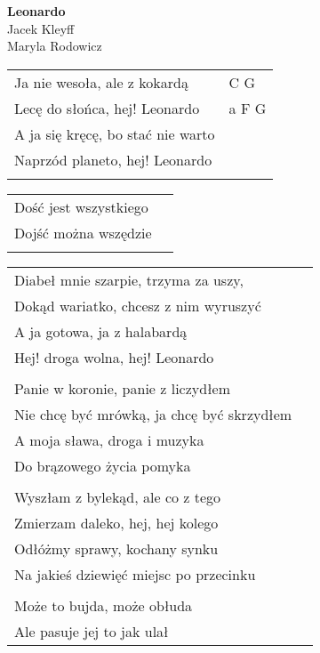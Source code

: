 \documentclass[a5paper]{article}
\begin{document}


\noindent
\fontsize{12pt}{15pt}\selectfont
\textbf{Leonardo} \\
\fontsize{8pt}{10pt}\selectfont
Jacek Kleyff \\ Maryla Rodowicz \\
\fontsize{10pt}{12pt}\selectfont
{}
\begin{tabular}{@{}p{7.50cm}p{3cm}@{}}
\noindent
Ja nie wesoła, ale z kokardą & C G \\
Lecę do słońca, hej! Leonardo & a F G \\
A ja się kręcę, bo stać nie warto \\
Naprzód planeto, hej! Leonardo \\ \\
\end{tabular}

\noindent
\begin{tabular}{@{}p{4.00cm}p{3cm}@{}}
Dość jest wszystkiego \\
Dojść można wszędzie  \\ \\
\end{tabular}

\noindent
\begin{tabular}{@{}p{6.50cm}p{3cm}@{}}
Diabeł mnie szarpie, trzyma za uszy,  \\
Dokąd wariatko, chcesz z nim wyruszyć \\
A ja gotowa, ja z halabardą \\
Hej! droga wolna, hej! Leonardo \\ \\

Panie w koronie, panie z liczydłem\\
Nie chcę być mrówką, ja chcę być skrzydłem\\
A moja sława, droga i muzyka\\
Do brązowego życia pomyka \\ \\

Wyszłam z bylekąd, ale co z tego \\
Zmierzam daleko, hej, hej kolego\\
Odłóżmy sprawy, kochany synku\\
Na jakieś dziewięć miejsc po przecinku\\ \\

Może to bujda, może obłuda\\
Ale pasuje jej to jak ulał
\end{tabular}
\end{document}
